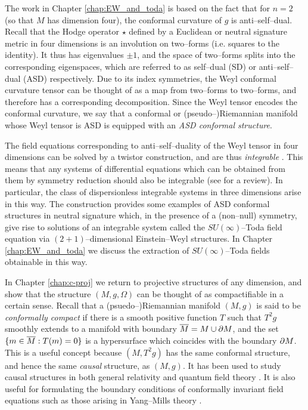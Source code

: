 The work in Chapter \ref{chap:EW_and_toda} is based on the fact that for $n=2$ (so that $M$ has dimension four), the conformal
curvature of $g$ is anti--self--dual. Recall that the Hodge operator
$\star$ defined by a Euclidean or neutral signature metric in four
dimensions is an involution on two--forms (i.e. squares to the identity).
It thus has eigenvalues $\pm1$, and the space of two--forms splits
into the corresponding eigenspaces, which are referred to as self--dual
(SD) or anti--self--dual (ASD) respectively. Due to its index symmetries,
the Weyl conformal curvature tensor can be thought of as a map from two--forms to two--forms,
and therefore has a corresponding decomposition. Since the Weyl tensor
encodes the conformal curvature, we say that a conformal or (pseudo--)Riemannian
manifold whose Weyl tensor is ASD is equipped with an \textit{ASD
conformal structure}.

The field equations corresponding to anti--self--duality of the Weyl
tensor in four dimensions can be solved by a twistor construction,
and are thus \textit{integrable} \cite{wardGauge}. This means that any systems of differential
equations which can be obtained from them by symmetry reduction should
also be integrable (see \cite{MW} for a review). In particular, the class of dispersionless
integrable systems in three dimensions arise in this way. The
construction \cite{DM} provides some examples of
ASD conformal structures in neutral signature which, in the presence
of a (non--null) symmetry, give rise to solutions of an integrable
system called the $SU(\infty)$--Toda field equation via $(2+1)$--dimensional
Einstein--Weyl structures. In Chapter \ref{chap:EW_and_toda} we discuss the extraction
of $SU(\infty)$--Toda fields obtainable in this way.

In Chapter \ref{chap:c-proj} we return to projective structures of any dimension, and show that the structure $(M,g,\Omega)$ can be thought of as compactifiable in a certain sense. Recall that a (psuedo--)Riemannian manifold $(M,g)$ is said to be \textit{conformally compact} if there is a smooth positive function $T$ such that $T^2g$ smoothly extends to a manifold with boundary $\overline{M}=M\cup\partial M$, and the set $\{m\in\overline{M}:T(m)=0\}$ is a hypersurface which coincides with the boundary $\partial M$.  This is a useful concept because $(M,T^2g)$ has the same conformal structure, and hence the same \textit{causal} structure, as $(M,g)$. It has been used to study causal structures in both general relativity \cite{penrose65} and quantum field theory \cite{witten}. It is also useful for formulating the boundary conditions of conformally invariant field equations such as those arising in Yang--Mills theory \cite{uhlen}.


